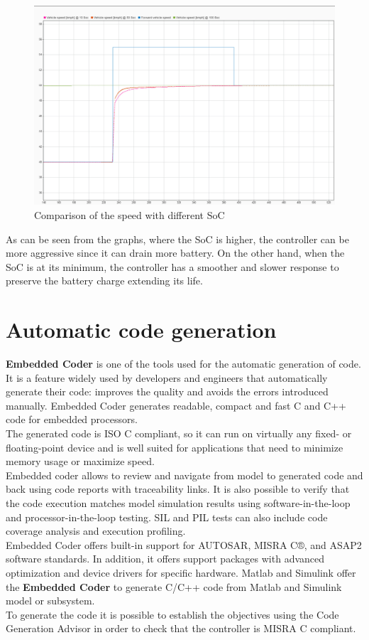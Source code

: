 \documentclass[12pt,a4paper]{report}
\begin{document}
\begin{figure}[htbp]
	\centering
	\includegraphics[scale=0.2]{compareSoC.jpeg}
	\caption{Comparison of the speed with different SoC}
\end{figure}

As can be seen from the graphs, where the SoC is higher, the controller can be more aggressive since it can drain more battery. On the other hand, when the SoC is at its minimum, the controller has a smoother and slower response to preserve the battery charge extending its life.


\section{Automatic code generation}
\textbf{Embedded Coder} is one of the tools used for the automatic generation of code. It is a feature widely used by developers and engineers that automatically generate their code: improves the quality and avoids the errors introduced manually. 
Embedded Coder generates readable, compact and fast C and C++ code for embedded processors. \\
The generated code is ISO C compliant, so it can run on virtually any fixed- or floating-point device and is well suited for applications that need to minimize memory usage or maximize speed. \\
Embedded coder allows to review and navigate from model to generated code and back using code reports with traceability links. It is also possible to verify that the code execution matches model simulation results using software-in-the-loop and processor-in-the-loop testing. SIL and PIL tests can also include code coverage analysis and execution profiling. \\
Embedded Coder offers built-in support for AUTOSAR, MISRA C®, and ASAP2 software standards. In addition, it offers support packages with advanced optimization and device drivers for specific hardware.
Matlab and Simulink offer the \textbf{Embedded Coder} to generate C/C++ code from Matlab and Simulink model or subsystem. \\
To generate the code it is possible to establish the objectives using the Code Generation Advisor in order to check that the controller is MISRA C compliant.\\
\end{document}
